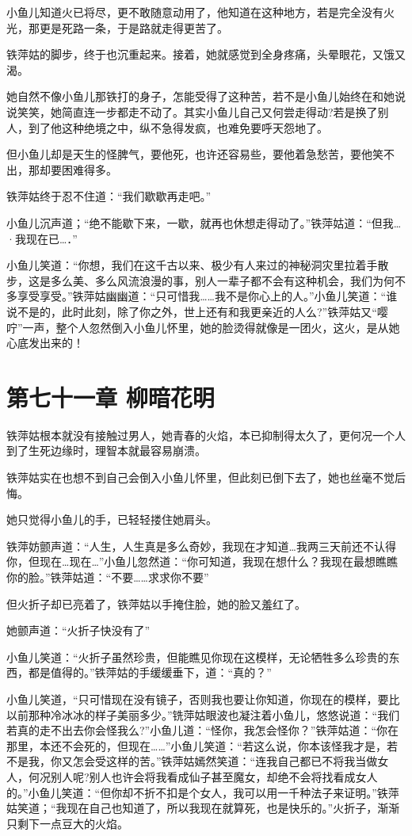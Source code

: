 \documentclass[12pt,oneside]{book}
\begin{document}
小鱼儿知道火已将尽，更不敢随意动用了，他知道在这种地方，若是完全没有火光，那更是死路一条，于是路就走得更苦了。

铁萍姑的脚步，终于也沉重起来。接着，她就感觉到全身疼痛，头晕眼花，又饿又渴。

她自然不像小鱼儿那铁打的身子，怎能受得了这种苦，若不是小鱼儿始终在和她说说笑笑，她简直连一步都走不动了。其实小鱼儿自己又何尝走得动?若是换了别人，到了他这种绝境之中，纵不急得发疯，也难免要呼天怨地了。

但小鱼儿却是天生的怪脾气，要他死，也许还容易些，要他着急愁苦，要他笑不出，那却要困难得多。

铁萍姑终于忍不住道：``我们歇歇再走吧。''

小鱼儿沉声道；``绝不能歇下来，一歇，就再也休想走得动了。''铁萍姑道：``但我\ldots·我现在已\ldots．''

小鱼儿笑道：``你想，我们在这千古以来、极少有人来过的神秘洞灾里拉着手散步，这是多么美、多么风流浪漫的事，别人一辈子都不会有这种机会，我们为何不多享受享受。''铁萍姑幽幽道：``只可惜我\ldots\ldots 我不是你心上的人。''小鱼儿笑道：``谁说不是的，此时此刻，除了你之外，世上还有和我更亲近的人么?''铁萍姑又``嘤咛''一声，整个人忽然倒入小鱼儿怀里，她的脸烫得就像是一团火，这火，是从她心底发出来的！

\hypertarget{ux7b2cux4e03ux5341ux4e00ux7ae0-ux67f3ux6697ux82b1ux660e}{%
\chapter{第七十一章
柳暗花明}\label{ux7b2cux4e03ux5341ux4e00ux7ae0-ux67f3ux6697ux82b1ux660e}}

铁萍姑根本就没有接触过男人，她青春的火焰，本已抑制得太久了，更何况一个人到了生死边缘时，理智本就最容易崩溃。

铁萍姑实在也想不到自己会倒入小鱼儿怀里，但此刻已倒下去了，她也丝毫不觉后悔。

她只觉得小鱼儿的手，已轻轻搂住她肩头。

铁萍妨颤声道：``人生，人生真是多么奇妙，我现在才知道\ldots 我两三天前还不认得你，但现在\ldots 现在\ldots{}''小鱼儿忽然道：``你可知道，我现在想什么？我现在最想瞧瞧你的脸。''铁萍姑道：``不要\ldots\ldots 求求你不要''

但火折子却已亮着了，铁萍姑以手掩住脸，她的脸又羞红了。

她颤声道：``火折子快没有了''

小鱼儿笑道：``火折子虽然珍贵，但能瞧见你现在这模样，无论牺牲多么珍贵的东西，都是值得的。''铁萍姑的手缓缓垂下，道：``真的？''

小鱼儿笑道，``只可惜现在没有镜子，否则我也要让你知道，你现在的模样，要比以前那种冷冰冰的样子美丽多少。''铣萍姑眼波也凝注着小鱼儿，悠悠说道：``我们若真的走不出去你会怪我么?''小鱼儿道：``怪你，我怎会怪你？''铁萍姑道：``你在那里，本还不会死的，但现在\ldots\ldots{}''小鱼儿笑道：``若这么说，你本该怪我才是，若不是我，你又怎会受这样的苦。''铁萍姑嫣然笑道：``连我自己都已不将我当做女人，何况别人呢?别人也许会将我看成仙子甚至魔女，却绝不会将找看成女人的。''小鱼儿笑道：``但你却不折不扣是个女人，我可以用一千种法子来证明。''铁萍姑笑道；``我现在自己也知道了，所以我现在就算死，也是快乐的。''火折子，渐渐只剩下一点豆大的火焰。
\end{document}
